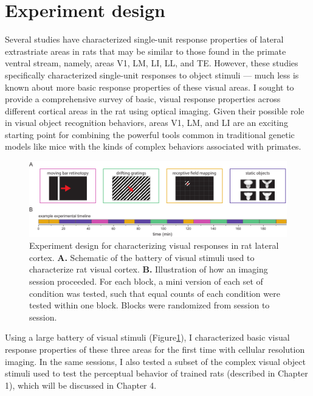 \section{Experiment design}
Several studies have characterized single-unit response properties of lateral extrastriate areas in rats that may be similar to those found in the primate ventral stream\cite{Tafazoli2017, Vermaercke2014, Vermaercke2015}, namely, areas V1, LM, LI, LL, and TE. However, these studies specifically characterized single-unit responses to object stimuli --- much less is known about more basic response properties of these visual areas. I sought to provide a comprehensive survey of basic, visual response properties across different cortical areas in the rat using optical imaging. Given their possible role in visual object recognition behaviors, areas V1, LM, and LI are an exciting starting point for combining the powerful tools common in traditional genetic models like mice with the kinds of complex behaviors associated with primates.  

\begin{figure}
    \includegraphics[width=\textwidth]{figures/chapter_3/fig_3-1_experiment_design/fig_3-1_experiment_design.pdf}
    \vspace{.1in}
    \caption[Experiment design]{Experiment design for characterizing visual responses in rat lateral cortex. 
    \textbf{A.} Schematic of the battery of visual stimuli used to characterize rat visual cortex. 
    \textbf{B.} Illustration of how an imaging session proceeded. For each block, a mini version of each set of condition was tested, such that equal counts of each condition were tested within one block. Blocks were randomized from session to session. 
    \label{fig:experiment_design}}
\end{figure}

Using a large battery of visual stimuli (Figure\ref{fig:experiment_design}), I characterized basic visual response properties of these three areas for the first time with cellular resolution imaging. In the same sessions, I also tested a subset of the complex visual object stimuli used to test the perceptual behavior of trained rats (described in Chapter 1), which will be discussed in Chapter 4. 

